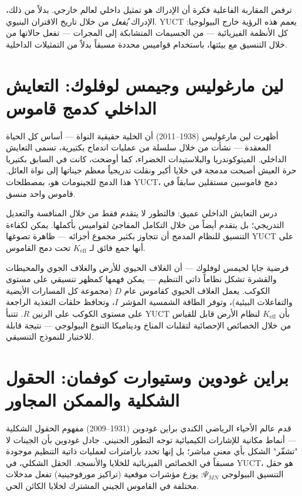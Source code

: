 \documentclass[12pt,a4paper]{article}
\begin{document}
	ترفض المقاربة الفاعلية فكرة أن الإدراك هو تمثيل داخلي لعالم خارجي. بدلاً من ذلك، الإدراك \emph{يُفعل} من خلال تاريخ الاقتران البنيوي. YUCT يعمم هذه الرؤية خارج البيولوجيا: كل الأنظمة الفيزيائية — من الجسيمات المتشابكة إلى المجرات — تفعل حالاتها من خلال التنسيق مع بيئتها، باستخدام قواميس محددة مسبقاً بدلاً من التمثيلات الداخلية.
	
	\section{لين مارغوليس وجيمس لوفلوك: التعايش الداخلي كدمج قاموس}
	
	أظهرت لين مارغوليس (1938–2011) أن الخلية حقيقية النواة — أساس كل الحياة المعقدة — نشأت من خلال سلسلة من عمليات اندماج بكتيرية، تسمى التعايش الداخلي. الميتوكوندريا والبلاستيدات الخضراء، كما أوضحت، كانت في السابق بكتيريا حرة العيش أصبحت مدمجة في خلايا أكبر ونقلت تدريجياً معظم جيناتها إلى نواة العائل. هذا الدمج للجينومات هو، بمصطلحات YUCT، دمج قاموسين مستقلين سابقاً في قاموس واحد منسق.
	
	درس التعايش الداخلي عميق: فالتطور لا يتقدم فقط من خلال المنافسة والتعديل التدريجي؛ بل يتقدم أيضاً من خلال التكامل المفاجئ لقواميس بأكملها. يمكن لكفاءة التنسيق للنظام المدمج أن تتجاوز بكثير مجموع أجزائه — ظاهرة تصوغها YUCT على أنها جمع فائق لـ \(K_{\mathrm{eff}}\) تحت دمج القاموس.
	
	فرضية جايا لجيمس لوفلوك — أن الغلاف الحيوي للأرض والغلاف الجوي والمحيطات والقشرة تشكل نظاماً ذاتي التنظيم — يمكن فهمها كمظهر تنسيقي على مستوى الكوكب. يعمل الغلاف الحيوي كقاموس عام \(D\) (مجموعة كل المسارات الأيضية والتفاعلات البيئية)، وتوفر الطاقة الشمسية المؤشر \(I\)، وتحافظ حلقات التغذية الراجعة على مستوى الكوكب على الرنين \(R\). تتنبأ YUCT بأن \(K_{\mathrm{eff}}\) لنظام الأرض قابل للقياس من خلال الخصائص الإحصائية لتقلبات المناخ وديناميكا التنوع البيولوجي — نتيجة قابلة للاختبار للنموذج التنسيقي.
	
	\section{براين غودوين وستيوارت كوفمان: الحقول الشكلية والممكن المجاور}
	
	قدم عالم الأحياء الرياضي الكندي براين غودوين (1931–2009) مفهوم الحقول الشكلية — أنماط مكانية للإشارات الكيميائية توجه التطور الجنيني. جادل غودوين بأن الجينات لا "تشفّر" الشكل بأي معنى مباشر؛ بل إنها تحدد بارامترات لعمليات ذاتية التنظيم موجودة مسبقاً في الخصائص الفيزيائية للخلايا والأنسجة. الحقل الشكلي، في YUCT، هو حقل التنسيق البيولوجي \(\Psi_{MN}\): يوزع مؤشرات موقعية (تراكيز مورفوجينية) تفعل مدخلات مختلفة في القاموس الجيني المشترك لخلايا الكائن الحي.
	
\end{document}
